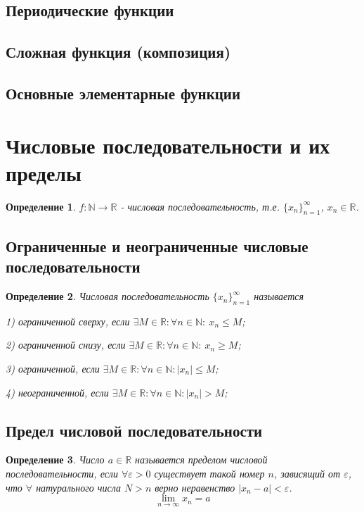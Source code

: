 \documentclass[a4paper,12pt]{article} %
\newtheorem{definition}{Определение}
\begin{document}
\subsection{Периодические функции}
\subsection{Сложная функция (композиция)}
\subsection{Основные элементарные функции}

\section{Числовые последовательности и их пределы}
\begin{definition}
	$f:\mathbb{N}\rightarrow \mathbb{R}$ - числовая последовательность, т.е. $\{x_n\}_{n=1}^\infty$, $x_n \in \mathbb{R}$.
\end{definition}

\subsection{Ограниченные и неограниченные числовые последовательности}

\begin{definition}
	Числовая последовательность $\{x_n\}_{n=1}^\infty$ называется 

1) ограниченной сверху, если $\exists M\in \mathbb{R}: \forall n\in \mathbb{N}: \ x_n\le M$;

2) ограниченной снизу, если \space $\exists M\in \mathbb{R}: \forall n\in \mathbb{N}: \ x_n\ge M$;

3) ограниченной, если \space\space\space\space\space\space\space\space\space $\exists M\in \mathbb{R}: \forall n\in \mathbb{N}:|x_n| \le M$;

4) неограниченной, если \space\space\space\space\space\space $\exists M\in \mathbb{R}: \forall n\in \mathbb{N}:|x_n|> M$;
\end{definition}

\subsection{Предел числовой последовательности}
\begin{definition}
	Число $a\in\mathbb{R}$ называется пределом числовой последовательности, если $\forall \varepsilon>0$ существует такой номер $n$, зависящий от $\varepsilon$, что $\forall$ натурального числа $N>n$ верно неравенство $|x_n - a| < \varepsilon$.
	$$\lim_{n\to\infty} x_n = a$$
\end{definition}
\end{document}
